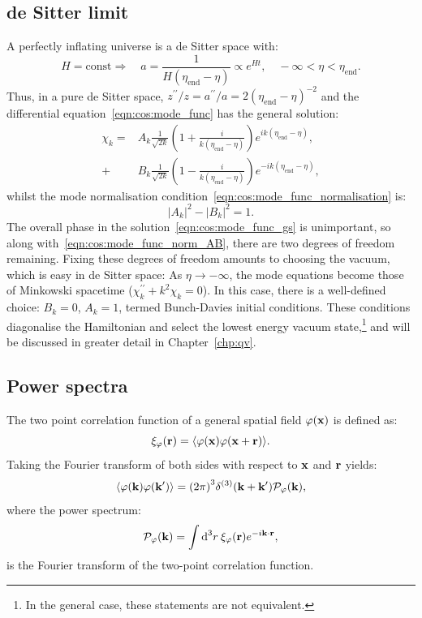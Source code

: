 \subsection{de Sitter limit}
A perfectly inflating universe is a de Sitter space with:
\begin{equation}
  H=\text{const}\Rightarrow \quad a = \frac{1}{H(\eta_\mathrm{end}-\eta)} \propto e^{Ht}, \quad -\infty<\eta<\eta_\mathrm{end}.
  \label{eqn:cos:de_sitter}
\end{equation}
Thus, in a pure de Sitter space, \({z^{\prime\prime}/z = a^{\prime\prime}/a= 2{(\eta_\mathrm{end}-\eta)}^{-2}}\) and the differential equation~\eqref{eqn:cos:mode_func} has the general solution:
\begin{align}
  \chi_k = &A_k \frac{1}{\sqrt{2k}}\left( 1+\frac{i}{k(\eta_\mathrm{end}-\eta)} \right)e^{ik(\eta_\mathrm{end}-\eta)}, \nonumber\\
  + &B_k \frac{1}{\sqrt{2k}}\left( 1-\frac{i}{k(\eta_\mathrm{end}-\eta)} \right)e^{-ik(\eta_\mathrm{end}-\eta)},
  \label{eqn:cos:mode_func_gs}
\end{align}
whilst the mode normalisation condition~\eqref{eqn:cos:mode_func_normalisation} is:
\begin{equation}
  |A_k|^2 - |B_k|^2 = 1.
  \label{eqn:cos:mode_func_norm_AB}
\end{equation}
The overall phase in the solution~\eqref{eqn:cos:mode_func_gs} is unimportant, so along with~\eqref{eqn:cos:mode_func_norm_AB}, there are two degrees of freedom remaining. Fixing these degrees of freedom amounts to choosing the vacuum, which is easy in de Sitter space: As \(\eta\rightarrow -\infty\), the mode equations become those of Minkowski spacetime (\(\chi_k^{\prime\prime} +k^2 \chi_k=0\)). In this case, there is a well-defined choice: \(B_k=0\), \(A_k=1\), termed Bunch-Davies initial conditions. These conditions diagonalise the Hamiltonian and select the lowest energy vacuum state,\footnote{In the general case, these statements are not equivalent.} and will be discussed in greater detail in Chapter~\ref{chp:qv}.

\subsection{Power spectra}
The two point correlation function of a general spatial field \(\varphi(\vx)\) is defined as:
\begin{equation}
  \xi_\varphi(\vr) = \mean{\varphi(\vx)\varphi(\vx + \vr)}.
\end{equation}
Taking the Fourier transform of both sides with respect to \(\vx\) and \(\vr\) yields:
\begin{equation}
  \mean{\varphi(\vk)\varphi(\vk^{\prime})} = {\left( 2\pi \right)}^3\delta^{(3)}(\vk + \vk^{\prime}) \mathcal{P}_\varphi(\vk),
  \label{eqn:cos:power_spectrum_definition}
\end{equation}
where the power spectrum:
\begin{equation}
  \mathcal{P}_\varphi(\vk) = \int \d[3]{r}\: \xi_\varphi(\vr)e^{-i\vk\cdot\vr},
\end{equation}
is the Fourier transform of the two-point correlation function.

